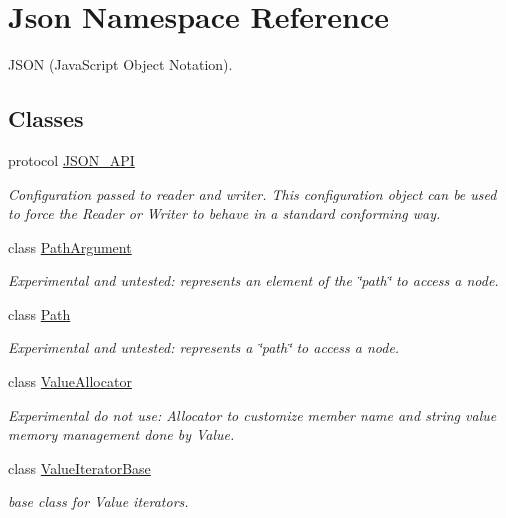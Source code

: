 \hypertarget{namespace_json}{\section{Json Namespace Reference}
\label{namespace_json}
}


J\-S\-O\-N (Java\-Script Object Notation).  


\subsection*{Classes}
\begin{DoxyCompactItemize}
\item 
protocol \hyperlink{protocol_json_1_1_j_s_o_n___a_p_i}{J\-S\-O\-N\-\_\-\-A\-P\-I}
\begin{DoxyCompactList}\small\item\em Configuration passed to reader and writer. This configuration object can be used to force the Reader or Writer to behave in a standard conforming way. \end{DoxyCompactList}\item 
class \hyperlink{class_json_1_1_path_argument}{Path\-Argument}
\begin{DoxyCompactList}\small\item\em Experimental and untested\-: represents an element of the \char`\"{}path\char`\"{} to access a node. \end{DoxyCompactList}\item 
class \hyperlink{class_json_1_1_path}{Path}
\begin{DoxyCompactList}\small\item\em Experimental and untested\-: represents a \char`\"{}path\char`\"{} to access a node. \end{DoxyCompactList}\item 
class \hyperlink{class_json_1_1_value_allocator}{Value\-Allocator}
\begin{DoxyCompactList}\small\item\em Experimental do not use\-: Allocator to customize member name and string value memory management done by Value. \end{DoxyCompactList}\item 
class \hyperlink{class_json_1_1_value_iterator_base}{Value\-Iterator\-Base}
\begin{DoxyCompactList}\small\item\em base class for Value iterators. \end{DoxyCompactList}\item 

\end{DoxyCompactItemize}
